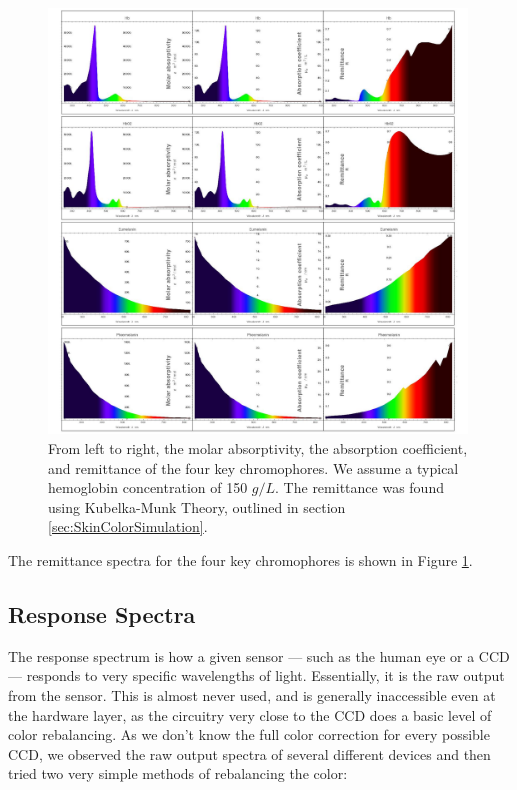 \begin{figure}[h!]
  \centering
    \includegraphics[width=0.99\textwidth]{Chapter1/Figs/ChemicalSpectralProperties.jpg}
    \caption{From left to right, the molar absorptivity, the absorption coefficient, and remittance of the four key chromophores. We assume a typical hemoglobin concentration of 150 $g/L$. The remittance was found using Kubelka-Munk Theory, outlined in section \ref{sec:SkinColorSimulation}. }  \label{fig:ChemicalSpectralProperties}
\end{figure}

The remittance spectra for the four key chromophores is shown in Figure \ref{fig:ChemicalSpectralProperties}. 

\subsection{Response Spectra}

The response spectrum is how a given sensor --- such as the human eye or a CCD --- responds to very specific wavelengths of light. Essentially, it is the raw output from the sensor. This is almost never used, and is generally inaccessible even at the hardware layer, as the circuitry very close to the CCD does a basic level of color rebalancing. As we don't know the full color correction for every possible CCD, we observed the raw output spectra of several different devices and then tried two very simple methods of rebalancing the color:

